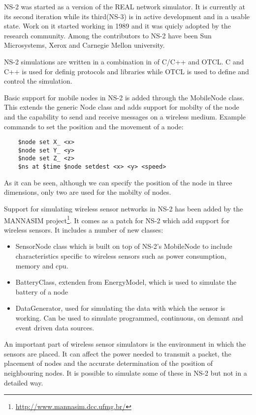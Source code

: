 \label{subsec:ns2}

NS-2 was started as a version of the REAL network simulator. It is currently at its 
second iteration while its third(NS-3) is in active development and in a usable state.
Work on it started working in 1989 and it was quicly adopted by the research community.
Among the contributors to NS-2 have been Sun Microsystems, Xerox and Carnegie Mellon 
university. 

NS-2 simulations are written in a combination in of C/C++ and OTCL. C and C++ is 
used for definig protocols and libraries while OTCL is used to define and control
the simulation.

Basic support for mobile nodes in NS-2 is added through the MobileNode class. This extends
the generic Node class and adds support for mobilty of the node and the capability to
send and receive messages on a wireless medium. 
Example commands to set the position and the movement of a node:
\lstset{numbers=none}
\begin{lstlisting}
	$node set X_ <x>
	$node set Y_ <y>
	$node set Z_ <z>
	$ns at $time $node setdest <x> <y> <speed>
\end{lstlisting}
As it can be seen, although we can specify the position of the node in three dimensions,
only two are used for the mobilty of nodes.

Support for simulating wireless sensor networks in NS-2 has been added by the 
MANNASIM project\footnote{\url{http://www.mannasim.dcc.ufmg.br/}}. It comes as
a patch for NS-2 which add support for wireless sensors. It includes a number of
new classes:
\begin{itemize}
	\item SensorNode class which is built on top of NS-2's MobileNode 
to include characteristics specific to wireless sensors such as power 
consumption, memory and cpu.
	\item BatteryClass, extenden from EnergyModel, which is used to simulate
the battery of a node
	\item DataGenerator, used for simulating the data with which the sensor is
working. Can be used to simulate programmed, continuous, on demant and event driven
data sources.
\end{itemize}

An important part of wireless sensor simulators is the environment in which the sensors
are placed. It can affect the power needed to transmit a packet, the placement of nodes
and the accurate determination of the position of neighbouring nodes. It is possible to
simulate some of these in NS-2 but not in a detailed way.
